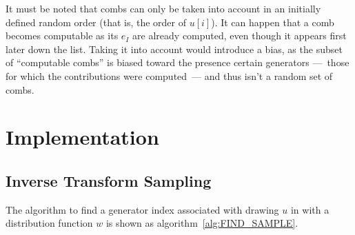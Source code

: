 \documentclass[./thesis.tex]{subfiles}
\begin{document}
It must be noted that combs can only be taken into account in an initially defined random order (that is, the order of $u[i]$).
It can happen that a comb becomes computable as its $e_I$ are already computed, even though it appears first later down the list. Taking it into account would introduce a bias, as the subset of ``computable combs'' is biased toward the presence certain generators ---~those for which the contributions were computed~--- and thus isn't a random set of combs.


\section{Implementation}

\subsection{Inverse Transform Sampling}

The algorithm to find a generator index associated with drawing $u$ in with a distribution function $w$ is shown as algorithm~\ref{alg:FIND_SAMPLE}.
\end{document}
